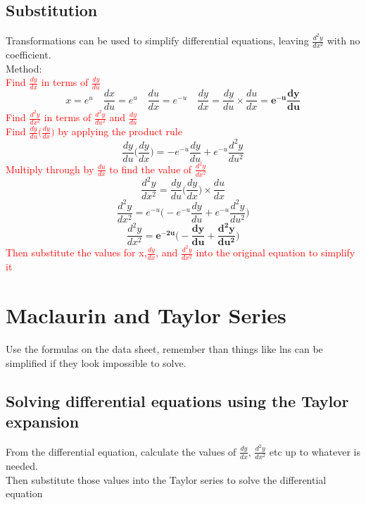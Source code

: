 \documentclass{article}[18pt]
\begin{document}
\subsection{Substitution}
Transformations can be used to simplify differential equations, leaving $\frac{d^2y}{dx^2}$ with no coefficient.\\
Method:\\
\textcolor{red}{\large Find $\frac{dy}{dx}$ in terms of $\frac{dy}{du}$}
$$x=e^u \quad \frac{dx}{du}=e^u \quad \frac{du}{dx}=e^{-u} \quad 
\frac{dy}{dx}=\frac{dy}{du}\times\frac{du}{dx}=\mathbf{e^{-u}\frac{dy}{du}}
$$
\textcolor{red}{\large Find $\frac{d^2y}{dx^2}$ in terms of $\frac{d^2y}{du^2}$ and $\frac{dy}{du}$}\\
\textcolor{red}{Find $\frac{dy}{du}\Big(\frac{dy}{dx}\Big)$ by applying the product rule}
$$\frac{dy}{du}\Big(\frac{dy}{dx}\Big)=-e^{-u}\frac{dy}{du}+e^{-u}\frac{d^2y}{du^2}$$
\textcolor{red}{Multiply through by $\frac{du}{dx}$ to find the value of $\frac{d^2y}{dx^2}$}
$$\frac{d^2y}{dx^2}=\frac{dy}{du}\Big(\frac{dy}{dx}\Big)\times\frac{du}{dx}$$
$$\frac{d^2y}{dx^2}=e^{-u}\Big(-e^{-u}\frac{dy}{du}+e^{-u}\frac{d^2y}{du^2}\Big)$$
$$\frac{d^2y}{dx^2}=\mathbf{e^{-2u}\Big(-\frac{dy}{du}+\frac{d^2y}{du^2}\Big)}$$
\textcolor{red}{Then substitute the values for x,$\frac{dy}{dx}$, and $\frac{d^2y}{dx^2}$ into the original equation to simplify it}

\section{Maclaurin and Taylor Series}
Use the formulas on the data sheet, remember than things like lns can be simplified if they look impossible to solve.
\subsection{Solving differential equations using the Taylor expansion}
From the differential equation, calculate the values of $\frac{dy}{dx}$, $\frac{d^2y}{dx^2}$ etc up to whatever is needed.\\
Then substitute those values into the Taylor series to solve the differential equation
\end{document}
